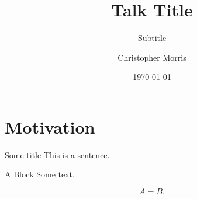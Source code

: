 \documentclass[10pt,xcolor=dvipsnames]{beamer}
\title{Talk Title}
\subtitle{Subtitle}
\date{\today}
\author{Christopher Morris}
\institute{TU Dortmund University, Germany}
\begin{document}
\maketitle

\section{Motivation}
\begin{frame}[fragile]{Some title}
	This is a sentence.
\begin{block}{A Block}
	Some text.
\end{block}
\begin{definition}
\begin{equation}
	A = B.
\end{equation}
\end{definition}
\end{frame}
\end{document}
